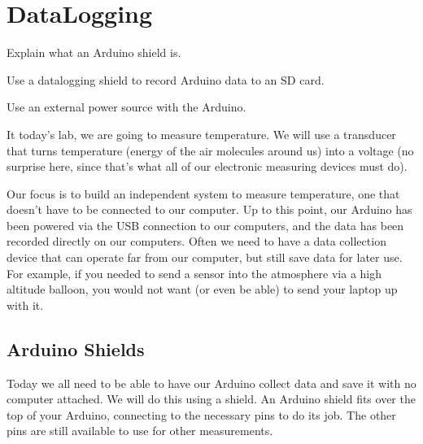 \chapter{DataLogging}

\objectives
{
\item Explain what an Arduino shield is.
\item Use a datalogging shield to record Arduino data to an SD card.
\item Use an external power source with the Arduino.
}

It today's lab, we are going to measure temperature. We will use a 
transducer that turns temperature (energy of the air molecules around us) 
into a voltage (no surprise here, since that's what all of our electronic
measuring devices must do). 

Our focus is to build an independent system to measure temperature, one that 
doesn't have to be connected to our computer. Up to this point, our Arduino
has been powered via the USB connection to our computers, and the data has
been recorded directly on our computers. 
Often we need to have a data collection device that can operate far from our 
computer, but still save data for later use. For example, if you needed to
send a sensor into the atmosphere via a high altitude balloon, you would not
want (or even be able) to send your laptop up with it.

\section{Arduino Shields}

Today we all need to be able to have our Arduino collect data and save it with 
no computer attached. We will do this using a shield. An Arduino shield fits 
over the top of your Arduino, connecting to the necessary pins to do its job. 
The other pins are still available to use for other measurements. 

